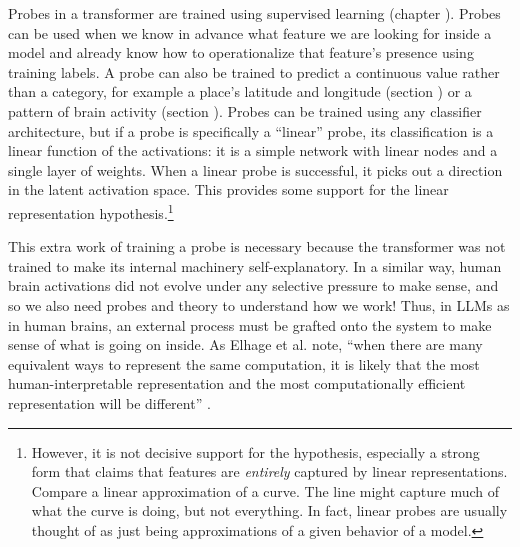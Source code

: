 Probes in a transformer are
trained using supervised learning (chapter ). Probes can
be used when we know in advance what feature we are looking for inside a model
and already know how to operationalize that feature's presence using training
labels. A probe can also be trained to predict a continuous value rather than
a category, for example a place's latitude and longitude (section
) or a pattern of brain activity (section
). Probes can be trained using any classifier architecture, but if a probe
is specifically a ``linear'' probe, its classification is a linear function of
the activations: it is a simple network with linear nodes and a single layer of
weights. When a linear probe is successful, it picks out a direction in the
latent activation space. This provides some support for the linear representation hypothesis.\footnote{However, it is not decisive support for the hypothesis, especially a strong form that claims that features are \emph{entirely} captured by linear representations. Compare a linear approximation of a curve. The line might capture much of what the curve is doing, but not everything. In fact, linear probes are usually thought of as just being approximations of a given behavior of a model.}


This extra work of training a probe is necessary because the transformer 
was not trained to make its internal machinery self-explanatory. In a similar
way, human brain activations did not evolve under any selective pressure to
make sense, and so we also need probes and theory to understand how we work!
Thus, in LLMs as in human brains, an external process must be grafted onto the
system to make sense of what is going on inside. As Elhage et al. note, ``when
there are many equivalent ways to represent the same computation, it is likely
that the most human-interpretable representation and the most computationally
efficient representation will be different'' \cite{elhage2021mathematical}.

